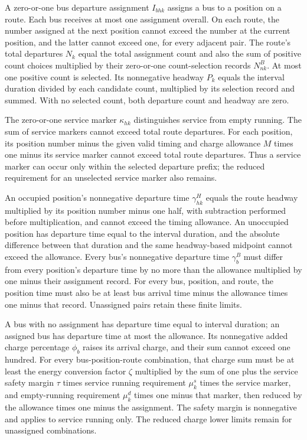 \documentclass[10pt]{article}
\begin{document}
A zero-or-one bus departure assignment $I_{bhk}$ assigns a bus to a position on a route. Each bus receives at most one assignment overall. On each route, the number assigned at the next position cannot exceed the number at the current position, and the latter cannot exceed one, for every adjacent pair. The route's total departures $N_k$ equal the total assignment count and also the sum of positive count choices multiplied by their zero-or-one count-selection records $N^B_{nk}$. At most one positive count is selected. Its nonnegative headway $P_k$ equals the interval duration divided by each candidate count, multiplied by its selection record and summed. With no selected count, both departure count and headway are zero.

The zero-or-one service marker $\kappa_{hk}$ distinguishes service from empty running. The sum of service markers cannot exceed total route departures. For each position, its position number minus the given valid timing and charge allowance $M$ times one minus its service marker cannot exceed total route departures. Thus a service marker can occur only within the selected departure prefix; the reduced requirement for an unselected service marker also remains.

An occupied position's nonnegative departure time $\gamma_{hk}^H$ equals the route headway multiplied by its position number minus one half, with subtraction performed before multiplication, and cannot exceed the timing allowance. An unoccupied position has departure time equal to the interval duration, and the absolute difference between that duration and the same headway-based midpoint cannot exceed the allowance. Every bus's nonnegative departure time $\gamma_b^B$ must differ from every position's departure time by no more than the allowance multiplied by one minus their assignment record. For every bus, position, and route, the position time must also be at least bus arrival time minus the allowance times one minus that record. Unassigned pairs retain these finite limits.

A bus with no assignment has departure time equal to interval duration; an assigned bus has departure time at most the allowance. Its nonnegative added charge percentage $\phi_b$ raises its arrival charge, and their sum cannot exceed one hundred. For every bus-position-route combination, that charge sum must be at least the energy conversion factor $\zeta$ multiplied by the sum of one plus the service safety margin $\tau$ times service running requirement $\mu_k^s$ times the service marker, and empty-running requirement $\mu_k^d$ times one minus that marker, then reduced by the allowance times one minus the assignment. The safety margin is nonnegative and applies to service running only. The reduced charge lower limits remain for unassigned combinations.
\end{document}
